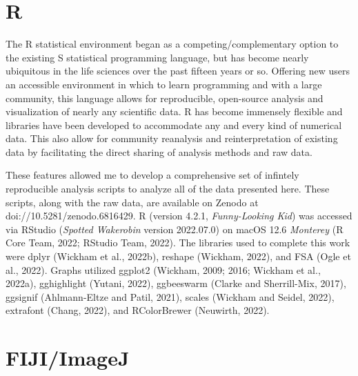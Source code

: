 \section{R}

The R statistical environment began as a competing/complementary option to the existing S statistical programming language, but has become nearly ubiquitous in the life sciences over the past fifteen years or so. Offering new users an accessible environment in which to learn programming and with a large community, this language allows for reproducible, open-source analysis and visualization of nearly any scientific data. R has become immensely flexible and libraries have been developed to accommodate any and every kind of numerical data. This also allow for community reanalysis and reinterpretation of existing data by facilitating the direct sharing of analysis methods and raw data. 

These features allowed me to develop a comprehensive set of infintely reproducible analysis scripts to analyze all of the data presented here. These scripts, along with the raw data, are available on Zenodo at doi://10.5281/zenodo.6816429. R (version 4.2.1, \textit{Funny-Looking Kid}) was accessed via RStudio (\textit{Spotted Wakerobin} version 2022.07.0) on macOS 12.6 \textit{Monterey} (R Core Team, 2022; RStudio Team, 2022). The libraries used to complete this work were dplyr (Wickham et al., 2022b), reshape (Wickham, 2022), and FSA (Ogle et al., 2022). Graphs utilized ggplot2 (Wickham, 2009; 2016; Wickham et al., 2022a), gghighlight (Yutani, 2022), ggbeeswarm (Clarke and Sherrill-Mix, 2017), ggsignif (Ahlmann-Eltze and Patil, 2021), scales (Wickham and Seidel, 2022), extrafont (Chang, 2022), and RColorBrewer (Neuwirth, 2022).

\section{FIJI/ImageJ}

